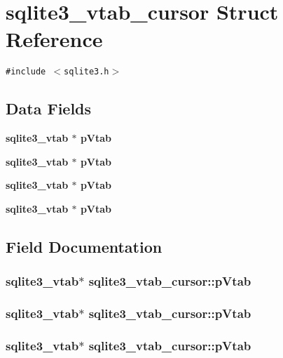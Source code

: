 \section{sqlite3\_\-vtab\_\-cursor Struct Reference}
\label{structsqlite3__vtab__cursor}
{\tt \#include $<$sqlite3.h$>$}

\subsection*{Data Fields}
\begin{CompactItemize}
\item 
\bf{sqlite3\_\-vtab} $\ast$ \bf{p\-Vtab}
\item 
\bf{sqlite3\_\-vtab} $\ast$ \bf{p\-Vtab}
\item 
\bf{sqlite3\_\-vtab} $\ast$ \bf{p\-Vtab}
\item 
\bf{sqlite3\_\-vtab} $\ast$ \bf{p\-Vtab}
\end{CompactItemize}


\subsection{Field Documentation}
\subsubsection{\setlength{\rightskip}{0pt plus 5cm}\bf{sqlite3\_\-vtab}$\ast$ \bf{sqlite3\_\-vtab\_\-cursor::p\-Vtab}}\label{structsqlite3__vtab__cursor_a94d21e499e768f8fec19423396f8e8c}


\subsubsection{\setlength{\rightskip}{0pt plus 5cm}\bf{sqlite3\_\-vtab}$\ast$ \bf{sqlite3\_\-vtab\_\-cursor::p\-Vtab}}\label{structsqlite3__vtab__cursor_a94d21e499e768f8fec19423396f8e8c}


\subsubsection{\setlength{\rightskip}{0pt plus 5cm}\bf{sqlite3\_\-vtab}$\ast$ \bf{sqlite3\_\-vtab\_\-cursor::p\-Vtab}}\label{structsqlite3__vtab__cursor_a94d21e499e768f8fec19423396f8e8c}



